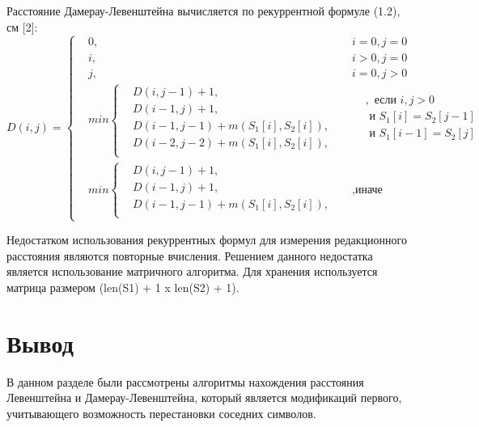 \documentclass[12pt, a4paper]{report}
\begin{document}
Расстояние Дамерау-Левенштейна вычисляется по рекуррентной формуле (1.2), см [2]:
		\begin{equation}
		     D(i, j) =  \left\{
			\begin{aligned}
				&0, && i = 0, j = 0\\
		    	&i, && i > 0, j = 0\\
		    	&j, && i = 0, j > 0\\		    	
		    	&min \left\{
				\begin{aligned}
					&D(i, j - 1) + 1,\\
		            &D(i - 1, j) + 1,\\
		            &D(i - 1, j - 1) + m(S_{1}[i], S_{2}[i]), \\
		            &D(i - 2, j - 2) + m(S_{1}[i], S_{2}[i]),\\
		        \end{aligned} \right.
		        && 
				\begin{aligned}
					&, \text{ если } i, j > 0 \\
		            & \text{ и } S_{1}[i] = S_{2}[j - 1] \\
		            & \text{ и } S_{1}[i - 1] =  S_{2}[j] \\
		        \end{aligned} \\ 
		        &min \left\{
		        \begin{aligned}
		            &D(i, j - 1) + 1,\\
		            &D(i - 1, j) + 1, \\
		            &D(i - 1, j - 1) + m(S_{1}[i], S_{2}[i]),\\
		        \end{aligned} \right.  &&, \text{иначе}
			\end{aligned} \right.
		\end{equation}

Недостатком использования рекуррентных формул для измерения редакционного расстояния являются повторные вчисления. 
Решением данного недостатка является использование матричного алгоритма. Для хранения используется матрица размером (len(S1) + 1 x len(S2) + 1).
\section{Вывод}
В данном разделе были рассмотрены алгоритмы нахождения расстояния Левенштейна и Дамерау-Левенштейна, который является модификаций первого, учитывающего возможность перестановки соседних символов. 
 
\end{document}
